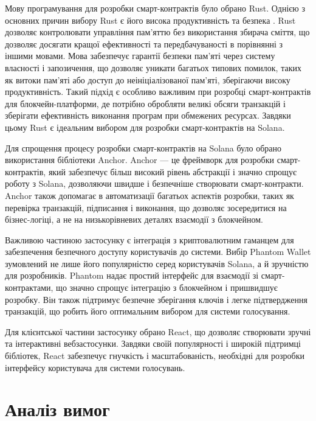 \documentclass[14pt]{extreport}
\begin{document}
  Мову програмування для розробки смарт-контрактів було обрано Rust. Однією з основних причин вибору Rust є його висока продуктивність та безпека \cite{rust}. Rust дозволяє контролювати управління пам'яттю без використання збирача сміття, що дозволяє досягати кращої ефективності та передбачуваності в порівнянні з іншими мовами. Мова забезпечує гарантії безпеки пам'яті через систему власності і запозичення, що дозволяє уникати багатьох типових помилок, таких як витоки пам'яті або доступ до неініціалізованої пам'яті, зберігаючи високу продуктивність. Такий підхід є особливо важливим при розробці смарт-контрактів для блокчейн-платформи, де потрібно обробляти великі обсяги транзакцій і зберігати ефективність виконання програм при обмежених ресурсах. Завдяки цьому Rust є ідеальним вибором для розробки смарт-контрактів на Solana.

  Для спрощення процесу розробки смарт-контрактів на Solana було обрано використання бібліотеки Anchor. Anchor — це фреймворк для розробки смарт-конт\-рактів, який забезпечує більш високий рівень абстракції і значно спрощує роботу з Solana, дозволяючи швидше і безпечніше створювати смарт-контракти. \cite{anchor} Anchor також допомагає в автоматизації багатьох аспектів розробки, таких як перевірка транзакцій, підписання і виконання, що дозволяє зосередитися на бізнес-логіці, а не на низькорівневих деталях взаємодії з блокчейном.

  Важливою частиною застосунку є інтеграція з криптовалютним гаманцем для забезпечення безпечного доступу користувачів до системи. Вибір Phantom Wallet зумовлений не лише його популярністю серед користувачів Solana, а й зручністю для розробників. Phantom надає простий інтерфейс для взаємодії зі смарт-контрактами, що значно спрощує інтеграцію з блокчейном і пришвидшує розробку. \cite{phantom} Він також підтримує безпечне зберігання ключів і легке підтвердження транзакцій, що робить його оптимальним вибором для системи голосування.

  Для клієнтської частини застосунку обрано React, що дозволяє створювати зручні та інтерактивні вебзастосунки. Завдяки своїй популярності і широкій підтримці бібліотек, React забезпечує гнучкість і масштабованість, необхідні для розробки інтерфейсу користувача для системи голосувань. \cite{react}
  
  \section{Аналіз вимог}
  
\end{document}
